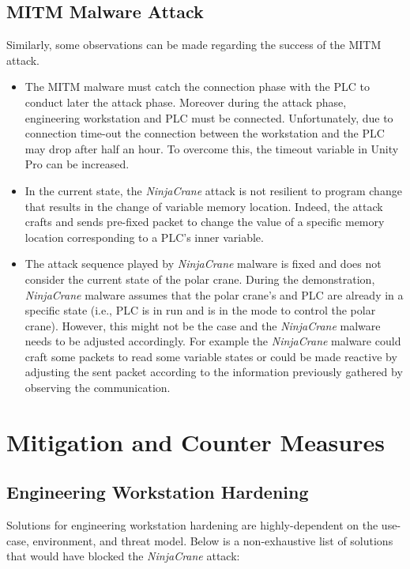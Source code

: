 \subsection{MITM Malware Attack}

Similarly, some observations can be made regarding the success of the MITM attack.

\begin{itemize}
    \item The MITM malware must catch the connection phase with the PLC to conduct later the attack phase. Moreover during the attack phase, engineering workstation and PLC must be connected. Unfortunately, due to connection time-out the connection between the workstation and the PLC may drop after half an hour. To overcome this, the timeout variable in Unity Pro can be increased. 
    
    \item In the current state, the \emph{NinjaCrane} attack is not resilient to program change that results in the change of variable memory location. Indeed, the attack crafts and sends pre-fixed packet to change the value of a specific memory location corresponding to a PLC's inner variable. 

    \item The attack sequence played by \emph{NinjaCrane} malware is fixed and does not consider the current state of the polar crane. During the demonstration, \emph{NinjaCrane} malware assumes that the polar crane's and PLC are already in a specific state (i.e., PLC is in run and is in the mode to control the polar crane). However, this might not be the case and the \emph{NinjaCrane} malware needs to be adjusted accordingly. For example the \emph{NinjaCrane} malware could craft some packets to read some variable states or could be made reactive by adjusting the sent packet according to the information previously gathered by observing the communication.
\end{itemize}

\section{Mitigation and Counter Measures}

\subsection{Engineering Workstation Hardening}

Solutions for engineering workstation hardening are highly-dependent on the use-case, environment, and threat model. Below is a non-exhaustive list of solutions that would have blocked the \emph{NinjaCrane} attack:

